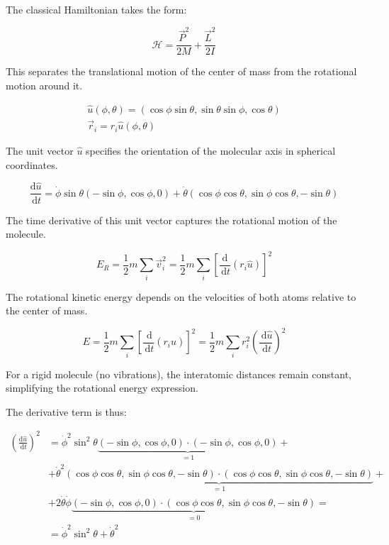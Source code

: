 The classical Hamiltonian takes the form:

\begin{equation}
\mathcal{H}=\frac{\vec{P}^{2}}{2 M}+\frac{\vec{L}^{2}}{2 I}
\end{equation}

This separates the translational motion of the center of mass from the rotational motion around it.

\[
\begin{array}{r}
\hat{u}(\phi, \theta)=(\cos \phi \sin \theta, \sin \theta \sin \phi, \cos \theta)  \\
\vec{r}_{i}=r_{i} \hat{u}(\phi, \theta)
\end{array}
\]

The unit vector $\hat{u}$ specifies the orientation of the molecular axis in spherical coordinates.

\begin{equation}
\frac{\mathrm{d} \hat{u}}{\, \mathrm{d} t}=\dot{\phi} \sin \theta(-\sin \phi, \cos \phi, 0)+\dot{\theta}(\cos \phi \cos \theta, \sin \phi \cos \theta,-\sin \theta)
\end{equation}

The time derivative of this unit vector captures the rotational motion of the molecule.

\begin{equation}
E_{R}=\frac{1}{2} m \sum_{i} \vec{v}_{i}^{2}=\frac{1}{2} m \sum_{i}\left[\frac{\mathrm{d}}{\, \mathrm{d} t}\left(r_{i} \hat{u}\right)\right]^{2}
\end{equation}

The rotational kinetic energy depends on the velocities of both atoms relative to the center of mass.

\begin{equation}
E=\frac{1}{2} m \sum_{i}\left[\frac{\, \mathrm{d}}{\, \mathrm{d} t}\left(r_{i} \hat{u}\right)\right]^{2}=\frac{1}{2} m \sum_{i} r_{i}^{2}\left(\frac{\, \mathrm{d} \hat{u}}{\, \mathrm{d} t}\right)^{2}
\end{equation}

For a rigid molecule (no vibrations), the interatomic distances remain constant, simplifying the rotational energy expression.

The derivative term is thus:

\begin{align}
\left(\frac{\mathrm{d} \hat{u}}{\, \mathrm{d} t}\right)^{2} & =\dot{\phi}^{2} \sin ^{2} \theta \underbrace{(-\sin \phi, \cos \phi, 0) \cdot(-\sin \phi, \cos \phi, 0)}_{=1}+ \\
& +\dot{\theta}^{2} \underbrace{(\cos \phi \cos \theta, \sin \phi \cos \theta,-\sin \theta) \cdot(\cos \phi \cos \theta, \sin \phi \cos \theta,-\sin \theta)}_{=1}+ \\
& +2 \dot{\theta} \dot{\phi} \underbrace{(-\sin \phi, \cos \phi, 0) \cdot(\cos \phi \cos \theta, \sin \phi \cos \theta,-\sin \theta)}_{=0}= \\
& =\dot{\phi}^{2} \sin ^{2} \theta+\dot{\theta}^{2}
\end{align}

